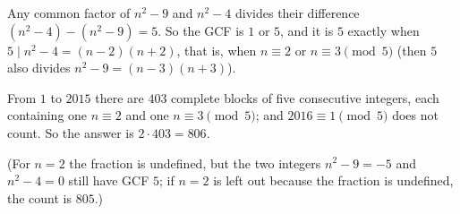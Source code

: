 Any common factor of $n^2-9$ and $n^2-4$ divides their difference $(n^2-4)-(n^2-9)=5$. So the GCF is $1$ or $5$, and it is $5$ exactly when $5\mid n^2-4=(n-2)(n+2)$, that is, when $n\equiv2$ or $n\equiv3\pmod5$ (then $5$ also divides $n^2-9=(n-3)(n+3)$).

From $1$ to $2015$ there are $403$ complete blocks of five consecutive integers, each containing one $n\equiv2$ and one $n\equiv3\pmod5$; and $2016\equiv1\pmod5$ does not count. So the answer is $2\cdot403=\boxed{806}$.

(For $n=2$ the fraction is undefined, but the two integers $n^2-9=-5$ and $n^2-4=0$ still have GCF $5$; if $n=2$ is left out because the fraction is undefined, the count is $805$.)
